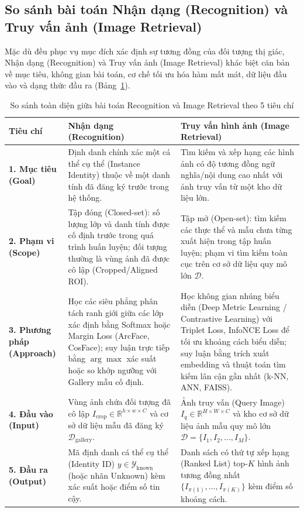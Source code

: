 \subsection{So sánh bài toán Nhận dạng (Recognition) và Truy vấn ảnh (Image Retrieval)}

Mặc dù đều phục vụ mục đích xác định sự tương đồng của đối tượng thị giác, Nhận dạng (Recognition) và Truy vấn ảnh (Image Retrieval) khác biệt căn bản về mục tiêu, không gian bài toán, cơ chế tối ưu hóa hàm mất mát, dữ liệu đầu vào và dạng thức đầu ra (Bảng~\ref{tab:comp_rec_retrieval}).

\begin{table}[H]
\centering
\small
\caption{So sánh toàn diện giữa bài toán Recognition và Image Retrieval theo 5 tiêu chí}
\label{tab:comp_rec_retrieval}
\renewcommand{\arraystretch}{1.3}
\begin{tabularx}{\textwidth}{|p{2.8cm}|X|X|}
\hline
\textbf{Tiêu chí} & \textbf{Nhận dạng (Recognition)} & \textbf{Truy vấn hình ảnh (Image Retrieval)} \\
\hline
\textbf{1. Mục tiêu (Goal)} & Định danh chính xác một cá thể cụ thể (Instance Identity) thuộc về một danh tính đã đăng ký trước trong hệ thống. & Tìm kiếm và xếp hạng các hình ảnh có độ tương đồng ngữ nghĩa/nội dung cao nhất với ảnh truy vấn từ một kho dữ liệu lớn. \\
\hline
\textbf{2. Phạm vi (Scope)} & Tập đóng (Closed-set): số lượng lớp và danh tính được cố định trước trong quá trình huấn luyện; đối tượng thường là vùng ảnh đã được cô lập (Cropped/Aligned ROI). & Tập mở (Open-set): tìm kiếm các thực thể và mẫu chưa từng xuất hiện trong tập huấn luyện; phạm vi tìm kiếm toàn cục trên cơ sở dữ liệu quy mô lớn $\mathcal{D}$. \\
\hline
\textbf{3. Phương pháp (Approach)} & Học các siêu phẳng phân tách ranh giới giữa các lớp xác định bằng Softmax hoặc Margin Loss (ArcFace, CosFace); suy luận trực tiếp bằng $\arg\max$ xác suất hoặc so khớp ngưỡng với Gallery mẫu cố định. & Học không gian nhúng biểu diễn (Deep Metric Learning / Contrastive Learning) với Triplet Loss, InfoNCE Loss để tối ưu khoảng cách biểu diễn; suy luận bằng trích xuất embedding và thuật toán tìm kiếm lân cận gần nhất (k-NN, ANN, FAISS). \\
\hline
\textbf{4. Đầu vào (Input)} & Vùng ảnh chứa đối tượng đã cô lập $I_{\text{crop}} \in \mathbb{R}^{h \times w \times C}$ và cơ sở dữ liệu mẫu đã đăng ký $\mathcal{D}_{\text{gallery}}$. & Ảnh truy vấn (Query Image) $I_q \in \mathbb{R}^{H \times W \times C}$ và kho cơ sở dữ liệu ảnh mẫu quy mô lớn $\mathcal{D} = \{I_1, I_2, \dots, I_M\}$. \\
\hline
\textbf{5. Đầu ra (Output)} & Mã định danh cá thể cụ thể (Identity ID) $y \in \mathcal{Y}_{\text{known}}$ (hoặc nhãn Unknown) kèm xác suất hoặc điểm số tin cậy. & Danh sách có thứ tự xếp hạng (Ranked List) top-$K$ hình ảnh tương đồng nhất $\{I_{\pi(1)}, \dots, I_{\pi(K)}\}$ kèm điểm số khoảng cách. \\
\hline
\end{tabularx}
\end{table}

